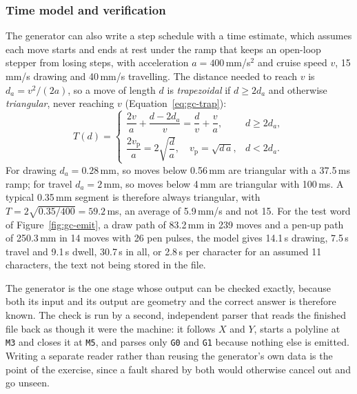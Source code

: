 \subsubsection{Time model and verification}
\label{sec:gc-verify}

The generator can also write a step schedule with a time estimate, which assumes each move starts and ends at rest under the ramp that keeps an open-loop stepper from losing steps, with acceleration $a=400$\,mm/s$^2$ and cruise speed $v$, 15\,mm/s drawing and 40\,mm/s travelling.
The distance needed to reach $v$ is $d_a=v^2/(2a)$, so a move of length $d$ is \emph{trapezoidal} if $d\ge2d_a$ and otherwise \emph{triangular}, never reaching $v$ (Equation~\ref{eq:gc-trap}):
\begin{equation}
T(d)=\begin{cases}\dfrac{2v}{a}+\dfrac{d-2d_a}{v}=\dfrac{d}{v}+\dfrac{v}{a},&d\ge2d_a,\\[2mm]\dfrac{2v_{\mathrm p}}{a}=2\sqrt{\dfrac{d}{a}},\quad v_{\mathrm p}=\sqrt{d\,a},&d<2d_a.\end{cases}
\label{eq:gc-trap}
\end{equation}
For drawing $d_a=0.28$\,mm, so moves below 0.56\,mm are triangular with a 37.5\,ms ramp; for travel $d_a=2$\,mm, so moves below 4\,mm are triangular with 100\,ms.
A typical 0.35\,mm segment is therefore always triangular, with $T=2\sqrt{0.35/400}=59.2$\,ms, an average of 5.9\,mm/s and not 15.
For the test word of Figure~\ref{fig:gc-emit}, a draw path of 83.2\,mm in 239 moves and a pen-up path of 250.3\,mm in 14 moves with 26 pen pulses, the model gives 14.1\,s drawing, 7.5\,s travel and 9.1\,s dwell, 30.7\,s in all, or 2.8\,s per character for an assumed 11 characters, the text not being stored in the file.

The generator is the one stage whose output can be checked exactly, because both its input and its output are geometry and the correct answer is therefore known. The check is run by a second, independent parser that reads the finished file back as though it were the machine: it follows $X$ and $Y$, starts a polyline at \texttt{M3} and closes it at \texttt{M5}, and parses only \texttt{G0} and \texttt{G1} because nothing else is emitted. Writing a separate reader rather than reusing the generator's own data is the point of the exercise, since a fault shared by both would otherwise cancel out and go unseen.

